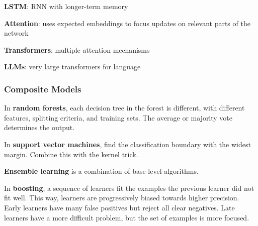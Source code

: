 \documentclass[11pt]{article}
\begin{document}
\textbf{LSTM}: RNN with longer-term memory

\textbf{Attention}: uses expected embeddings to focus updates on relevant parts of the network

\textbf{Transformers}: multiple attention mechanisms

\textbf{LLMs}: very large transformers for language
\subsubsection{Composite Models}
\label{sec:org7011113}
In \textbf{random forests}, each decision tree in the forest is different, with different features,
splitting criteria, and training sets.
The average or majority vote determines the output.

In \textbf{support vector machines}, find the classification boundary with the widest margin.
Combine this with the kernel trick.

\textbf{Ensemble learning} is a combination of base-level algorithms.

In \textbf{boosting}, a sequence of learners fit the examples the previous learner did not fit well.
This way, learners are progressively biased towards higher precision.
Early learners have many false positives but reject all clear negatives.
Late learners have a more difficult problem, but the set of examples is more focused.
\end{document}
